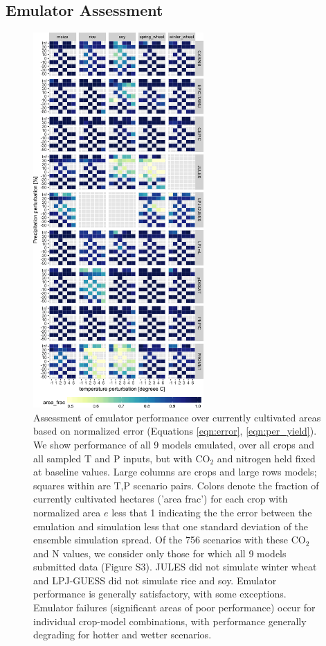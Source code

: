 \documentclass[gmd, manuscript]{copernicus} %
\begin{document}
\subsection{Emulator Assessment}
\label{S:4}
\begin{figure}[ht]
\centering
    \includegraphics[width=6.5cm]{figures/error_360.png}
    \caption{Assessment of emulator performance over currently cultivated areas based on normalized error (Equations \ref{eqn:error}, \ref{eqn:per_yield}). 
    We show performance of all 9 models emulated, over all crops and all sampled T and P inputs, but with CO$_2$ and nitrogen held fixed at baseline values. 
    Large columns are crops and large rows models; squares within are T,P scenario pairs. 
    Colors denote the fraction of currently cultivated hectares ('area frac') for each crop with normalized area $e$ less that 1 indicating the the error between the emulation and simulation less that one standard deviation of the ensemble simulation spread. 
    Of the 756 scenarios with these CO$_2$ and N values, we consider only those for which all 9 models submitted data (Figure S3). 
    JULES did not simulate winter wheat and LPJ-GUESS did not simulate rice and soy. Emulator performance is generally satisfactory, with some exceptions. 
    Emulator failures (significant areas of poor performance) occur for individual crop-model combinations, with performance generally degrading for hotter and wetter scenarios.}
   \label{fig:error_360}
\end{figure}
\end{document}
